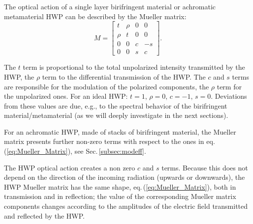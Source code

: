 The optical action of a single layer birifringent material or achromatic metamaterial HWP can be described by the Mueller matrix:
\begin{equation}
M=\begin{bmatrix}
   t  &\rho  &0  &0\\
   \rho  &t  &0  &0\\
   0  &0  &c  &-s\\
   0  &0  &s  &c
\end{bmatrix}.
\label{eq:Mueller_Matrix}
\end{equation}

The $t$ term is proportional to the total unpolarized intensity transmitted by the HWP, the $\rho$ term to the differential transmission of the HWP. The $c$ and $s$ terms are responsible for the modulation of the polarized components, the $\rho$ term for the unpolarized ones. For an ideal HWP: $t=1$, $\rho=0$, $c=-1$, $s=0$. Deviations from these values are due, e.g., to the spectral behavior of the birifringent material/metamaterial (as we will deeply investigate in the next sections).

For an achromatic HWP, made of stacks of birifringent material, the Mueller matrix presents further non-zero terms with respect to the ones in eq.\,(\ref{eq:Mueller_Matrix}), see Sec.\,\ref{subsec:modeff}. 

The HWP optical action creates a non zero $c$ and $s$ terms. Because this does not depend on the direction of the incoming radiation (upwards or downwards), the HWP Mueller matrix has the same shape, eq.\,(\ref{eq:Mueller_Matrix}), both in transmission and in reflection; the value of the corresponding Mueller matrix components changes according to the amplitudes of the electric field transmitted and reflected by the HWP.








